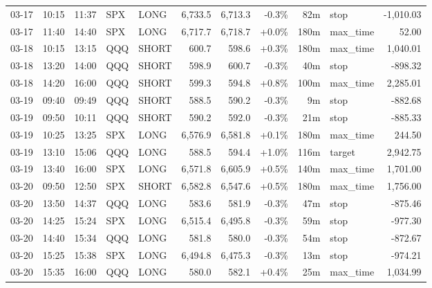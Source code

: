 \documentclass[11pt,a4paper,twoside]{article}
\begin{document}
\begin{center}
\begin{longtable}{>{\color{txtmain}}l l l l l r r r r >{\color{txtmain}}l r}
03-17 & 10:15 & 11:37 & SPX & LONG & 6,733.5 & 6,713.3 & \textcolor{lossred}{-0.3\%} & 82m & stop & \textcolor{lossred}{-1,010.03} \\
03-17 & 11:40 & 14:40 & SPX & LONG & 6,717.7 & 6,718.7 & \textcolor{wingreen}{+0.0\%} & 180m & max\_time & \textcolor{wingreen}{52.00} \\
03-18 & 10:15 & 13:15 & QQQ & SHORT & 600.7 & 598.6 & \textcolor{wingreen}{+0.3\%} & 180m & max\_time & \textcolor{wingreen}{1,040.01} \\
03-18 & 13:20 & 14:00 & QQQ & SHORT & 598.9 & 600.7 & \textcolor{lossred}{-0.3\%} & 40m & stop & \textcolor{lossred}{-898.32} \\
03-18 & 14:20 & 16:00 & QQQ & SHORT & 599.3 & 594.8 & \textcolor{wingreen}{+0.8\%} & 100m & max\_time & \textcolor{wingreen}{2,285.01} \\
03-19 & 09:40 & 09:49 & QQQ & SHORT & 588.5 & 590.2 & \textcolor{lossred}{-0.3\%} & 9m & stop & \textcolor{lossred}{-882.68} \\
03-19 & 09:50 & 10:11 & QQQ & SHORT & 590.2 & 592.0 & \textcolor{lossred}{-0.3\%} & 21m & stop & \textcolor{lossred}{-885.33} \\
03-19 & 10:25 & 13:25 & SPX & LONG & 6,576.9 & 6,581.8 & \textcolor{wingreen}{+0.1\%} & 180m & max\_time & \textcolor{wingreen}{244.50} \\
03-19 & 13:10 & 15:06 & QQQ & LONG & 588.5 & 594.4 & \textcolor{wingreen}{+1.0\%} & 116m & target & \textcolor{wingreen}{2,942.75} \\
03-19 & 13:40 & 16:00 & SPX & LONG & 6,571.8 & 6,605.9 & \textcolor{wingreen}{+0.5\%} & 140m & max\_time & \textcolor{wingreen}{1,701.00} \\
03-20 & 09:50 & 12:50 & SPX & SHORT & 6,582.8 & 6,547.6 & \textcolor{wingreen}{+0.5\%} & 180m & max\_time & \textcolor{wingreen}{1,756.00} \\
03-20 & 13:50 & 14:37 & QQQ & LONG & 583.6 & 581.9 & \textcolor{lossred}{-0.3\%} & 47m & stop & \textcolor{lossred}{-875.46} \\
03-20 & 14:25 & 15:24 & SPX & LONG & 6,515.4 & 6,495.8 & \textcolor{lossred}{-0.3\%} & 59m & stop & \textcolor{lossred}{-977.30} \\
03-20 & 14:40 & 15:34 & QQQ & LONG & 581.8 & 580.0 & \textcolor{lossred}{-0.3\%} & 54m & stop & \textcolor{lossred}{-872.67} \\
03-20 & 15:25 & 15:38 & SPX & LONG & 6,494.8 & 6,475.3 & \textcolor{lossred}{-0.3\%} & 13m & stop & \textcolor{lossred}{-974.21} \\
03-20 & 15:35 & 16:00 & QQQ & LONG & 580.0 & 582.1 & \textcolor{wingreen}{+0.4\%} & 25m & max\_time & \textcolor{wingreen}{1,034.99} \\
\end{longtable}
\end{center}
\clearpage
\end{document}
